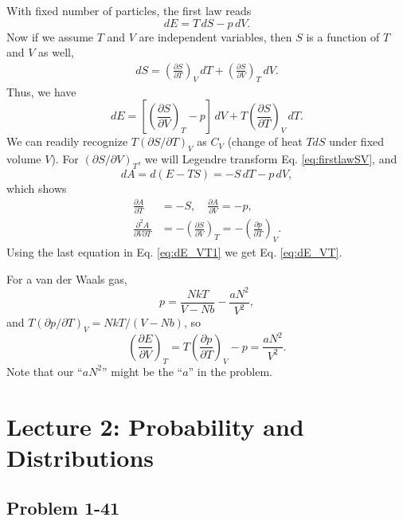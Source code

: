 \documentclass[twocolumn, 10pt]{article}
\numberwithin{equation}{section}
\newenvironment{solution}[1][\empty]
{\par\medskip
  \textbf{\ifx\empty#1{Solution.}\relax\else{#1}\fi} \ignorespaces}
{\medskip}
\begin{document}
\begin{solution}
With fixed number of particles,
the first law reads
\begin{equation}
  dE = T \, dS - p \, dV.
  \label{eq:firstlawSV}
\end{equation}
Now if we assume $T$ and $V$ are independent variables,
then $S$ is a function of $T$ and $V$ as well,
\begin{align*}
dS = \left( \frac{ \partial S }{ \partial T } \right)_V \, dT
+ \left( \frac{ \partial S } { \partial V } \right)_T \, d V.
\end{align*}
Thus, we have
\begin{equation}
  dE =
    \left[\left( \frac{ \partial S } { \partial V } \right)_T -p \right]\, d V
  +T \left( \frac{ \partial S }{ \partial T } \right)_V \, dT.
  \label{eq:dE_VT1}
\end{equation}
We can readily recognize $T(\partial S/\partial T)_V$ as $C_V$
  (change of heat $TdS$ under fixed volume $V$).
%
For $(\partial S/\partial V)_T$,
we will Legendre transform Eq. \eqref{eq:firstlawSV}, and
$$
dA = d(E-TS) = - S \, dT - p \, dV,
$$
which shows
\begin{align*}
  \frac{\partial A } { \partial T} &= -S, \quad
  \frac{\partial A } { \partial V} = -p, \\
  \frac{\partial^2 A } { \partial V \partial T}
  &=
  -\left( \frac{\partial S }{\partial V} \right)_T
  =
  -\left( \frac{\partial p }{\partial T} \right)_V.
\end{align*}
Using the last equation in Eq. \eqref{eq:dE_VT1}
  we get Eq. \eqref{eq:dE_VT}.

For a van der Waals gas,
  $$
  p = \frac{NkT}{V-Nb} - \frac{aN^2}{V^2},
  $$
  and
  $T (\partial p/\partial T)_V = NkT/(V-Nb)$,
  so
  $$
  \left( \frac{ \partial E } { \partial V} \right)_T
  =
  T \left( \frac{ \partial p} {\partial T } \right)_V - p
  =
  \frac{ a N^2 } { V^2 }.
  $$
Note that our ``$aN^2$'' might be the ``$a$''
in the problem.
\end{solution}

\section{Lecture 2: Probability and Distributions}

\subsection{Problem 1-41}
\end{document}
